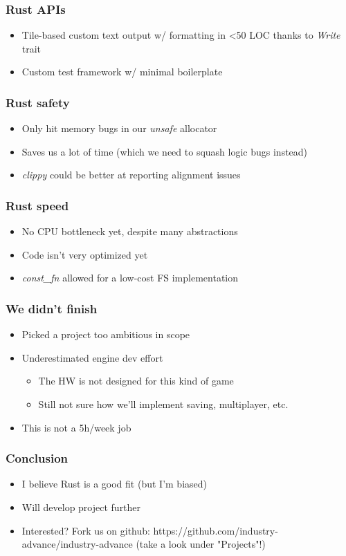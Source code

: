 \documentclass{beamer}
\begin{document}
\begin{frame}
\frametitle{Rust APIs}
\begin{itemize}
	\item Tile-based custom text output w/ formatting in <50 LOC thanks to \emph{Write} trait
	\item Custom test framework w/ minimal boilerplate
\end{itemize}
\end{frame}

\begin{frame}
\frametitle{Rust safety}
\begin{itemize}
	\item Only hit memory bugs in our \emph{unsafe} allocator
	\item Saves us a lot of time (which we need to squash logic bugs instead)
	\item \emph{clippy} could be better at reporting alignment issues
\end{itemize}
\end{frame}

\begin{frame}
\frametitle{Rust speed}
\begin{itemize}
	\item No CPU bottleneck yet, despite many abstractions
	\item Code isn't very optimized yet
    \item \emph{const\_fn} allowed for a low-cost FS implementation
\end{itemize}
\end{frame}

\begin{frame}
\frametitle{We didn't finish}
\begin{itemize}
	\item Picked a project too ambitious in scope
	\item Underestimated engine dev effort \begin{itemize}
		\item The HW is not designed for this kind of game
		\item Still not sure how we'll implement saving, multiplayer, etc.
	\end{itemize}
	\item This is not a 5h/week job
\end{itemize}
\end{frame}

\begin{frame}
\frametitle{Conclusion}
\begin{itemize}
    \item I believe Rust is a good fit (but I'm biased)
	\item Will develop project further
	\item Interested? Fork us on github: https://github.com/industry-advance/industry-advance (take a look under "Projects"!)
\end{itemize}
\end{frame}
\end{document}
